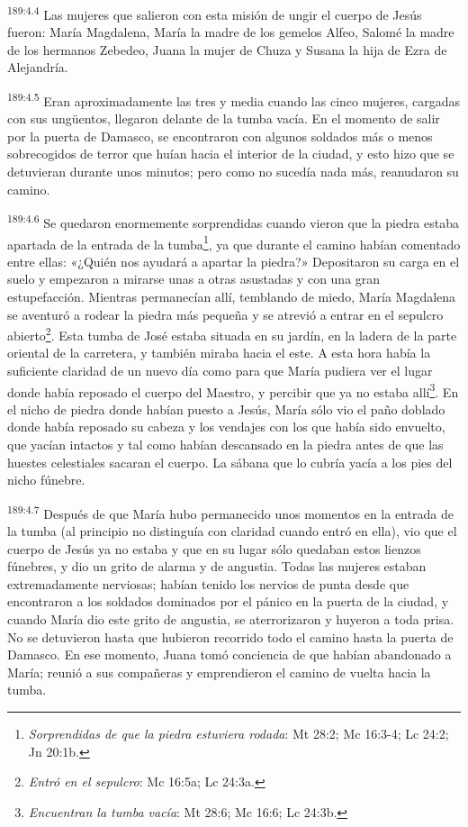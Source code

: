 \par 
\textsuperscript{189:4.4} Las mujeres que salieron con esta misión de ungir el cuerpo de Jesús fueron: María Magdalena, María la madre de los gemelos Alfeo, Salomé la madre de los hermanos Zebedeo, Juana la mujer de Chuza y Susana la hija de Ezra de Alejandría.

\par 
\textsuperscript{189:4.5} Eran aproximadamente las tres y media cuando las cinco mujeres, cargadas con sus ung\"uentos, llegaron delante de la tumba vacía. En el momento de salir por la puerta de Damasco, se encontraron con algunos soldados más o menos sobrecogidos de terror que huían hacia el interior de la ciudad, y esto hizo que se detuvieran durante unos minutos; pero como no sucedía nada más, reanudaron su camino.

\par 
\textsuperscript{189:4.6} Se quedaron enormemente sorprendidas cuando vieron que la piedra estaba apartada de la entrada de la tumba\footnote{\textit{Sorprendidas de que la piedra estuviera rodada}: Mt 28:2; Mc 16:3-4; Lc 24:2; Jn 20:1b.}, ya que durante el camino habían comentado entre ellas: «¿Quién nos ayudará a apartar la piedra?» Depositaron su carga en el suelo y empezaron a mirarse unas a otras asustadas y con una gran estupefacción. Mientras permanecían allí, temblando de miedo, María Magdalena se aventuró a rodear la piedra más pequeña y se atrevió a entrar en el sepulcro abierto\footnote{\textit{Entró en el sepulcro}: Mc 16:5a; Lc 24:3a.}. Esta tumba de José estaba situada en su jardín, en la ladera de la parte oriental de la carretera, y también miraba hacia el este. A esta hora había la suficiente claridad de un nuevo día como para que María pudiera ver el lugar donde había reposado el cuerpo del Maestro, y percibir que ya no estaba allí\footnote{\textit{Encuentran la tumba vacía}: Mt 28:6; Mc 16:6; Lc 24:3b.}. En el nicho de piedra donde habían puesto a Jesús, María sólo vio el paño doblado donde había reposado su cabeza y los vendajes con los que había sido envuelto, que yacían intactos y tal como habían descansado en la piedra antes de que las huestes celestiales sacaran el cuerpo. La sábana que lo cubría yacía a los pies del nicho fúnebre.

\par 
\textsuperscript{189:4.7} Después de que María hubo permanecido unos momentos en la entrada de la tumba (al principio no distinguía con claridad cuando entró en ella), vio que el cuerpo de Jesús ya no estaba y que en su lugar sólo quedaban estos lienzos fúnebres, y dio un grito de alarma y de angustia. Todas las mujeres estaban extremadamente nerviosas; habían tenido los nervios de punta desde que encontraron a los soldados dominados por el pánico en la puerta de la ciudad, y cuando María dio este grito de angustia, se aterrorizaron y huyeron a toda prisa. No se detuvieron hasta que hubieron recorrido todo el camino hasta la puerta de Damasco. En ese momento, Juana tomó conciencia de que habían abandonado a María; reunió a sus compañeras y emprendieron el camino de vuelta hacia la tumba.

